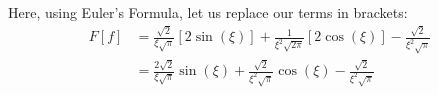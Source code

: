 \begin{enumerate}
Here, using Euler's Formula, let us replace our terms in brackets:
%
\begin{align}
  F[f]
  & =
  \frac{\sqrt 2}{\xi \sqrt\pi }
  \left[
    2 \sin(\xi)
  \right]
  +
  \frac{1}{ \xi^2 \sqrt{2 \pi} }
  \left[
    2 \cos(\xi)
  \right]
    - \frac{\sqrt 2}{ \xi^2 \sqrt\pi }\\
%
  & =
  \frac{2 \sqrt 2}{\xi \sqrt\pi }
  \sin(\xi)
  +
  \frac{\sqrt 2}{ \xi^2 \sqrt\pi }
  \cos(\xi)
  - \frac{\sqrt 2}{ \xi^2 \sqrt\pi }
\end{align}
\end{enumerate}
